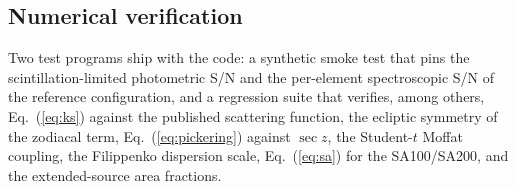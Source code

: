 \subsection{Numerical verification}

Two test programs ship with the code: a synthetic smoke test that pins the
scintillation-limited photometric S/N and the per-element spectroscopic S/N
of the reference configuration, and a regression suite that verifies, among
others, Eq.~(\ref{eq:ks}) against the published scattering function, the
ecliptic symmetry of the zodiacal term, Eq.~(\ref{eq:pickering}) against
$\sec z$, the Student-$t$ Moffat coupling, the Filippenko dispersion scale,
Eq.~(\ref{eq:sa}) for the SA100/SA200, and the extended-source area
fractions.
